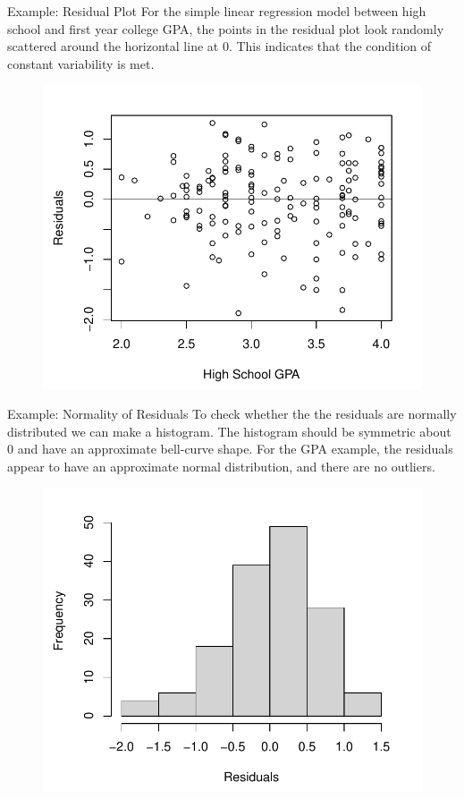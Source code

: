 \documentclass[11pt]{beamer}\usepackage[]{graphicx}\usepackage[]{color}
\begin{document}
\begin{frame}{Example: Residual Plot}
For the simple linear regression model between high school and first year college GPA, the points in the residual plot look randomly scattered around the horizontal line at 0.  This indicates that the condition of constant variability is met.
\begin{figure}
\includegraphics[scale=0.5]{figure/gpa_resid.pdf}
\end{figure}
\end{frame}

\begin{frame}{Example: Normality of Residuals}
To check whether the the residuals are normally distributed we can make a histogram.  The histogram should be symmetric about 0 and have an approximate bell-curve shape.  For the GPA example, the residuals appear to have an approximate normal distribution, and there are no outliers.
\begin{figure}
\includegraphics[scale=0.5]{figure/hist_resid.pdf}
\end{figure}
\end{frame}
\end{document}
